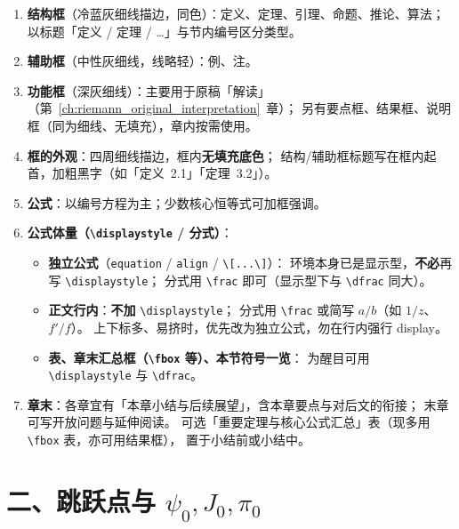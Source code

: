 \begin{enumerate}[leftmargin=2em,itemsep=0.35em]
  \item \textbf{结构框}（冷蓝灰细线描边，同色）：定义、定理、引理、命题、推论、算法；
        以标题「定义 / 定理 / …」与节内编号区分类型。
  \item \textbf{辅助框}（中性灰细线，线略轻）：例、注。
  \item \textbf{功能框}（深灰细线）：主要用于原稿「解读」
        （第~\ref{ch:riemann_original_interpretation}~章）；
        另有要点框、结果框、说明框（同为细线、无填充），章内按需使用。
  \item \textbf{框的外观}：四周细线描边，框内\textbf{无填充底色}；
        结构/辅助框标题写在框内起首，加粗黑字（如「定义~2.1」「定理~3.2」）。
  \item \textbf{公式}：以编号方程为主；少数核心恒等式可加框强调。
  \item \textbf{公式体量（\texttt{\textbackslash displaystyle} / 分式）}：
        \begin{itemize}
          \item \textbf{独立公式}（\texttt{equation} / \texttt{align} /
                \texttt{\textbackslash[...\textbackslash]}）：
                环境本身已是显示型，\textbf{不必}再写 \texttt{\textbackslash displaystyle}；
                分式用 \texttt{\textbackslash frac} 即可（显示型下与 \texttt{\textbackslash dfrac} 同大）。
          \item \textbf{正文行内}：\textbf{不加} \texttt{\textbackslash displaystyle}；
                分式用 \texttt{\textbackslash frac} 或简写 $a/b$（如 $1/z$、$f'/f$）。
                上下标多、易挤时，优先改为独立公式，勿在行内强行 display。
          \item \textbf{表、章末汇总框（\texttt{\textbackslash fbox} 等）、本节符号一览}：
                为醒目可用 \texttt{\textbackslash displaystyle} 与 \texttt{\textbackslash dfrac}。
        \end{itemize}
  \item \textbf{章末}：各章宜有「本章小结与后续展望」，含本章要点与对后文的衔接；
        末章可写开放问题与延伸阅读。
        可选「重要定理与核心公式汇总」表（现多用 \texttt{\textbackslash fbox} 表，亦可用结果框），
        置于小结前或小结中。
\end{enumerate}

\section*{二、跳跃点与 \texorpdfstring{$\psi_0,J_0,\pi_0$}{psi0,J0,pi0}}

